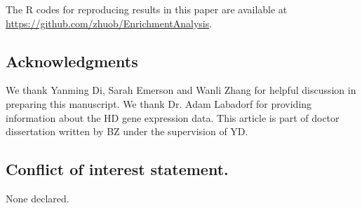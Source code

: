 	The R codes for reproducing results in this paper are available at
	\url{https://github.com/zhuob/EnrichmentAnalysis}.
	
	
	
		
	\subsection*{Acknowledgments}\label{section:acknowledgment}
	
	We thank Yanming Di, Sarah Emerson and Wanli Zhang for helpful discussion in preparing this 
	manuscript. We thank Dr. Adam Labadorf for providing information about the HD gene expression 
	data. This article is part of doctor dissertation written by BZ under the supervision of YD.
	
	
	\subsection*{Conflict of interest statement.} None declared.
	
	\newpage

